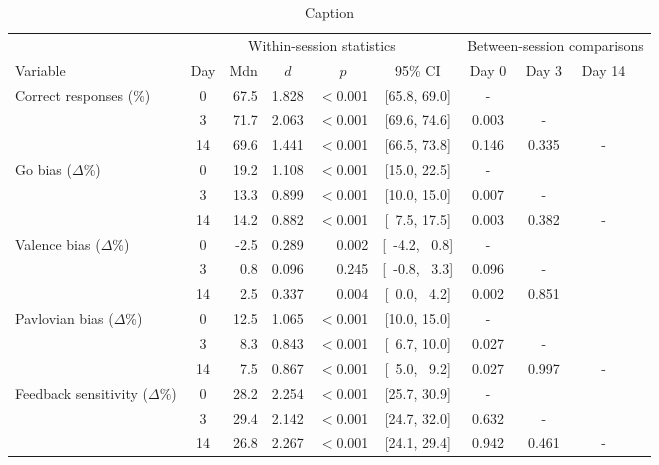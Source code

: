 \documentclass[a4paper,12pt]{article}
\begin{document}
\begin{refsection}[supp]
\begin{table}[h!]
    \centering
    \small
    \begin{adjustbox}{center}
    \begin{tabular}{lcrrrccccc}
        \toprule
                 & \multicolumn{5}{c}{Within-session statistics} & \multicolumn{4}{c}{Between-session comparisons} \\
        \cmidrule(lr){2-6} \cmidrule(lr){7-9}
        Variable & Day & Mdn & \multicolumn{1}{c}{$d$} & \multicolumn{1}{c}{$p$} & 95\% CI & Day 0 & Day 3 & Day 14 \\
        \midrule
         Correct responses (\%)     &  0 & 67.5 &  1.828 & $<$0.001 & [65.8, 69.0] & -     &       &       &   \\
                                    &  3 & 71.7 &  2.063 & $<$0.001 & [69.6, 74.6] & 0.003 & -     &       &   \\
                                    & 14 & 69.6 &  1.441 & $<$0.001 & [66.5, 73.8] & 0.146 & 0.335 & -     &   \\
        \midrule
        Go bias ($\Delta$\%)        &  0 & 19.2 &  1.108 & $<$0.001 & [15.0, 22.5]  & -     &       &       &   \\
                                    &  3 & 13.3 &  0.899 & $<$0.001 & [10.0, 15.0]  & 0.007 & -     &       &   \\
                                    & 14 & 14.2 &  0.882 & $<$0.001 & [\ 7.5, 17.5] & 0.003 & 0.382 & -     &   \\
        \midrule
        Valence bias ($\Delta$\%)   &  0 &  -2.5 &  0.289 &    0.002 & [\ -4.2, \ 0.8] &        - &       &       &   \\
                                    &  3 &  0.8 &  0.096 &    0.245 & [\ -0.8, \ 3.3]  & 0.096 & -     &       &   \\
                                    & 14 &  2.5 &  0.337 &    0.004 & [\ 0.0, \ 4.2] & 0.002 & 0.851     &       &   \\
        \midrule
        Pavlovian bias ($\Delta$\%) &  0 & 12.5 & 1.065 & $<$0.001 & [10.0, 15.0] &        - &       &       &   \\
                                    &  3 &  8.3 & 0.843 & $<$0.001 & [\ 6.7, 10.0] & 0.027 & -     &       &   \\
                                    & 14 &  7.5 & 0.867 & $<$0.001 & [\ 5.0, \ 9.2] & 0.027 & 0.997 & -     &   \\
        \midrule
        \footnotesize Feedback sensitivity ($\Delta$\%) &  0 & 28.2 & 2.254 & $<$0.001 & [25.7, 30.9] &        - &       &       &   \\
                                    &  3 & 29.4 & 2.142 & $<$0.001 & [24.7, 32.0] & 0.632 & -     &       &   \\
                                    & 14 & 26.8 & 2.267 & $<$0.001 & [24.1, 29.4] & 0.942 & 0.461 & -     &   \\
        \bottomrule
    \end{tabular}
    \end{adjustbox}
    \caption{Caption}
    \label{tab:stats_exp02}
\end{table}


\end{refsection}
\end{document}
